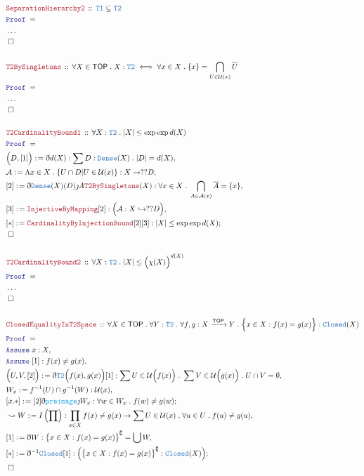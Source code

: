 \documentclass[12pt]{scrartcl}
\newcommand{\TYPE}[1]{\textcolor{NavyBlue}{\mathtt{#1}}}
\newcommand{\FUNC}[1]{\textcolor{Cerulean}{\mathtt{#1}}}
\newcommand{\LOGIC}[1]{\textcolor{Blue}{\mathtt{#1}}}
\newcommand{\THM}[1]{\textcolor{Maroon}{\mathtt{#1}}}
\renewcommand{\.}{\; . \;}
\newcommand{\de}{: \kern 0.1pc =}
\newcommand{\Act}[1]{\left( #1 \right)}
\newcommand{\Theorem}[2]{& \THM{#1} \, :: \, #2 \\ & \Proof = \\ }
\newcommand{\Page}[1]{ \begin{align*} #1 \end{align*}   }
\newcommand{ \bd }{ \ByDef }
\newcommand{\NoProof}{ & \ldots \\ \EndProof}
\newcommand{\ToInj}{\hookrightarrow}
\newcommand{\Arrow}{\xrightarrow}
\renewcommand{\c}{\complement}
\newcommand{\Say}[3]{& #1 \de #2 : #3, \\}
\newcommand{\Conclude}[3]{& #1 \de #2 : #3; \\}
\newcommand{\Derive}[3]{& \leadsto #1 \de #2 : #3, \\}
\newcommand{\Assume}[2]{& \LOGIC{Assume} \; #1 : #2, \\}
\newcommand{\QED}{\; \square}
\newcommand{\EndProof}{& \QED \\}
\newcommand{\ByDef}{\eth}
\newcommand{\ByConstr}{\jmath}
\newcommand{\Proof}{\LOGIC{Proof} \; }
\newcommand{\A}{\mathcal{A}}
\newcommand{\TOP}{\mathsf{TOP}}
\renewcommand{\U}{\mathcal{U}}
\begin{document}
\Page{
	\Theorem{SeparationHierarchy2}
	{
		\TYPE{T1} \subsetneq \TYPE{T2}
	}
	\NoProof
	\\
	\Theorem{T2BySingletons}
	{
		\forall X \in \TOP \.
		X : \TYPE{T2} \iff 
		\forall x \in X \. 
		\{x\} = \bigcap_{U \in \U(x)} \overline{U}
	}
	\NoProof
	\\
	\Theorem{T2CardinalityBound1}
	{
		\forall X : \TYPE{T2} \.
		|X| \le \exp \exp d(X)
	}
	\Say{\Big(D,[1]\Big)}{\bd d(X)}{\sum D : \TYPE{Dense}(X) \. |D| = d(X)  }
	\Say{\A}{\Lambda x \in X \. \{ U \cap D | U \in \U(x)  \} }
	{
		X \to ??D
	}
	\Say{[2]}{\bd \TYPE{Dense}(X)(D)\ByConstr A \THM{T2BySingletons}(X)}
	{
		\forall x \in X \. \bigcap_{A \in \A(x)} \overline{A} = \{ x \}
	}
	\Say{[3]}{\THM{InjectiveByMapping}[2]}
	{
		\Big( \A : X \ToInj ??D \Big)
	}
	\Conclude{[*]}{\THM{CardinalityByInjectionBound}[2][3]}
	{
		|X| \le \exp \exp d(X)                              
	}
	\EndProof
	\\
	\Theorem{T2CardinalityBound2}
	{
		\forall X : \TYPE{T2} \.
		|X| \le \Big(\chi(X)\Big)^{d(X)}
	}
	\NoProof
	\\
	\Theorem{ClosedEqualityInT2Space}
	{
		\forall X \in \TOP \.
		\forall Y : \TYPE{T2} \.
		\forall f,g : X \Arrow{\TOP} Y \.
		\Big\{ x \in X : f(x) = g(x) \Big\} : \TYPE{Closed}(X)
	}
	\Assume{x}{X}
	\Assume{[1]}{f(x) \neq g(x)}
	\Say{\Big(U,V, [2]\Big)}{\bd \TYPE{T2}\Big( f(x),g(x)\Big)[1]}
	{
		\sum U \in \U\Big(f(x)\Big) \. 
		\sum V \in \U\Big(g(x)\Big) \. 
		U \cap V = \emptyset
	}
	\Say{W_x}{f^{-1}(U) \cap g^{-1}(W)}
	{
		\U(x)
	}
	\Conclude{[x.*]}{[2]\bd \FUNC{preimage}\ByConstr W_x}{\forall w \in W_x \. f(w) \neq g(w)} 
	\Derive{W}{I\Act{\prod}}
	{
		\prod_{x \in X} f(x) \neq g(x) \to \sum U \in \U(x) \. \forall u \in U \. f(u) \neq g(u) 
	}
	\Say{[1]}{\bd W}{  \big\{x \in X : f(x) = g(x) \big\}^\c = \bigcup W}
	\Conclude{[*]}{\bd^{-1} \TYPE{Closed}[1]}{ \Big( \big\{ x \in X : f(x) = g(x) \big\}^\c : \TYPE{Closed}(X)  \Big) }
	\EndProof
}
\end{document}
